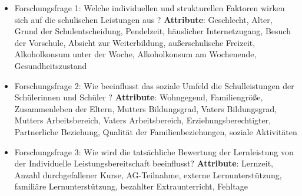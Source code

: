 \begin{itemize}
    \item Forschungsfrage 1: Welche individuellen und strukturellen Faktoren wirken sich auf die schulischen Leistungen aus ?
        \subitem \textbf{Attribute}: Geschlecht, Alter, Grund der Schulentscheidung, Pendelzeit, häuslicher Internetzugang, Besuch der Vorschule, Absicht zur Weiterbildung, außerschulische Freizeit, Alkoholkonsum unter der Woche, Alkoholkonsum am Wochenende, Gesundheitszustand
    \item Forschungsfrage 2: Wie beeinflusst das soziale Umfeld die Schulleistungen der Schülerinnen und Schüler ? 
        \subitem \textbf{Attribute}: Wohngegend, Familiengröße, Zusammenleben der Eltern, Mutters Bildungsgrad, Vaters Bildungsgrad, Mutters Arbeitsbereich, Vaters Arbeitsbereich, Erziehungsberechtigter, Partnerliche Beziehung, Qualität der Familienbeziehungen, soziale Aktivitäten
    \item Forschungsfrage 3: Wie wird die tatsächliche Bewertung der Lernleistung von der Individuelle Leistungsbereitschaft beeinflusst?
        \subitem \textbf{Attribute}: Lernzeit, Anzahl durchgefallener Kurse, AG-Teilnahme, externe Lernunterstützung, familiäre Lernunterstützung, bezahlter Extraunterricht, Fehltage
\end{itemize}




